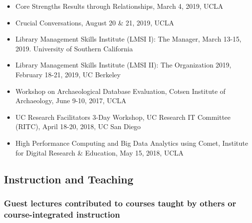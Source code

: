 \begin{itemize}[label={},leftmargin=!,labelindent=5pt,itemindent=-15pt]
  \item Core Strengths Results through Relationships, March 4, 2019, UCLA
  \item Crucial Conversations, August 20 \& 21, 2019, UCLA
  \item Library Management Skills Institute (LMSI I): The Manager, March 13-15, 2019. University of Southern California
  \item Library Management Skills Institute (LMSI II): The Organization 2019, February 18-21, 2019, UC Berkeley
  \item Workshop on Archaeological Database Evaluation, Cotsen Institute of Archaeology, June 9-10, 2017, UCLA
  \item UC Research Facilitators 3-Day Workshop,  UC Research IT Committee (RITC), April 18-20, 2018, UC San Diego
  \item High Performance Computing and Big Data Analytics using Comet, Institute for Digital Research \& Education, May 15, 2018, UCLA
\end{itemize}



\subsection{Instruction and Teaching}

\subsubsection{Guest lectures contributed to courses taught by others or course-integrated instruction}

